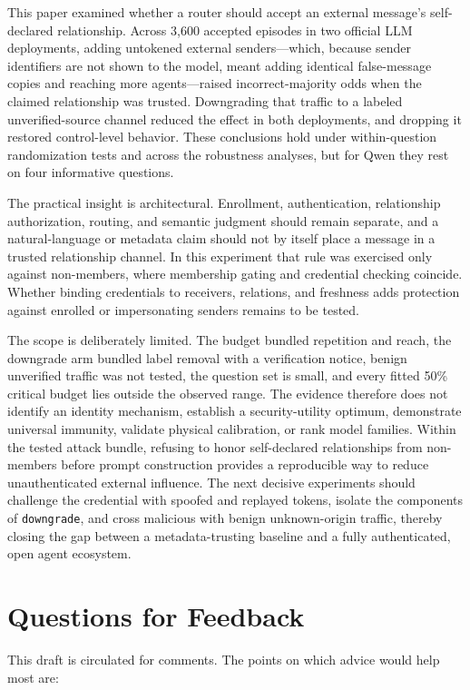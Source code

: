 \documentclass[11pt]{article}
\begin{document}
This paper examined whether a router should accept an external message's self-declared relationship. Across 3,600 accepted episodes in two official LLM deployments, adding untokened external senders—which, because sender identifiers are not shown to the model, meant adding identical false-message copies and reaching more agents—raised incorrect-majority odds when the claimed relationship was trusted. Downgrading that traffic to a labeled unverified-source channel reduced the effect in both deployments, and dropping it restored control-level behavior. These conclusions hold under within-question randomization tests and across the robustness analyses, but for Qwen they rest on four informative questions.

The practical insight is architectural. Enrollment, authentication, relationship authorization, routing, and semantic judgment should remain separate, and a natural-language or metadata claim should not by itself place a message in a trusted relationship channel. In this experiment that rule was exercised only against non-members, where membership gating and credential checking coincide. Whether binding credentials to receivers, relations, and freshness adds protection against enrolled or impersonating senders remains to be tested.

The scope is deliberately limited. The budget bundled repetition and reach, the downgrade arm bundled label removal with a verification notice, benign unverified traffic was not tested, the question set is small, and every fitted 50\% critical budget lies outside the observed range. The evidence therefore does not identify an identity mechanism, establish a security-utility optimum, demonstrate universal immunity, validate physical calibration, or rank model families. Within the tested attack bundle, refusing to honor self-declared relationships from non-members before prompt construction provides a reproducible way to reduce unauthenticated external influence. The next decisive experiments should challenge the credential with spoofed and replayed tokens, isolate the components of \texttt{downgrade}, and cross malicious with benign unknown-origin traffic, thereby closing the gap between a metadata-trusting baseline and a fully authenticated, open agent ecosystem.

\section{Questions for Feedback}

This draft is circulated for comments. The points on which advice would help most are:
\end{document}
